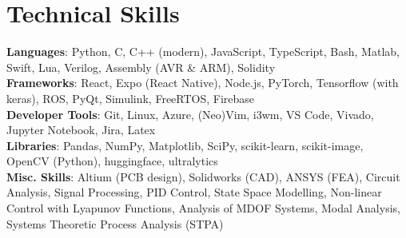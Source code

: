 \documentclass[letterpaper,11pt]{article}
\begin{document}
\section{Technical Skills}
\begin{itemize}[leftmargin=0.15in, label={}]
  \small{\item{
                \textbf{Languages}{: Python, C, C++ (modern), JavaScript, TypeScript, Bash, Matlab, Swift, Lua, Verilog, Assembly (AVR \& ARM), Solidity} \\
                \textbf{Frameworks}{: React, Expo (React Native), Node.js, PyTorch, Tensorflow (with keras), ROS, PyQt, Simulink, FreeRTOS, Firebase} \\
                \textbf{Developer Tools}{: Git, Linux, Azure, (Neo)Vim, i3wm, VS Code, Vivado, Jupyter Notebook, Jira, Latex} \\
                \textbf{Libraries}{: Pandas, NumPy, Matplotlib, SciPy, scikit-learn, scikit-image, OpenCV (Python), huggingface, ultralytics} \\
                \textbf{Misc. Skills}{: Altium (PCB design), Solidworks (CAD), ANSYS (FEA), Circuit Analysis, Signal Processing, PID Control, State Space Modelling, Non-linear Control with Lyapunov Functions}, Analysis of MDOF Systems, Modal Analysis, Systems Theoretic Process Analysis (STPA)
          }}
\end{itemize}

\end{document}
